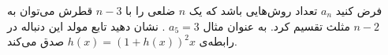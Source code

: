 \EXERCISE
فرض کنید
$a_n$
تعداد روش‌هایی باشد که یک
$n$
ضلعی را با
$n - 3$
قطرش می‌توان به
$n - 2$
مثلث تقسیم کرد. به عنوان مثال
$a_5 = 3$
. نشان دهید تابع مولد این دنباله در رابطه‌ی
$h(x) = (1 + h(x))^2x$
صدق می‌کند.